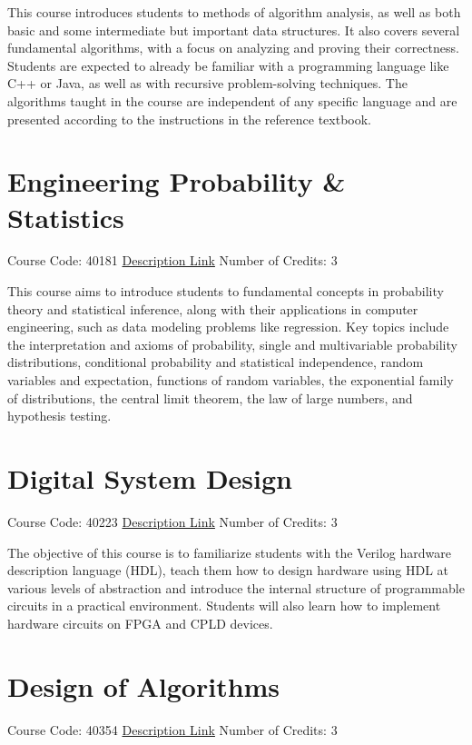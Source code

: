 \documentclass[
fontsize=11pt,
paper=a4,
parskip=half,
enlargefirstpage=off,    %
fromalign=right,        %
fromphone=on,           %
fromemail=on,
fromrule=off,           %
addrfield=off,          %
backaddress=on,         %
subject=beforeopening,  %
locfield=narrow,        %
foldmarks=off,          %
open=any
]{scrartcl}
\begin{document}
This course introduces students to methods of algorithm analysis, as well as both basic and some intermediate but important data structures. It also covers several fundamental algorithms, with a focus on analyzing and proving their correctness. Students are expected to already be familiar with a programming language like C++ or Java, as well as with recursive problem-solving techniques. The algorithms taught in the course are independent of any specific language and are presented according to the instructions in the reference textbook.

\section{Engineering Probability \& Statistics}
Course Code: 40181 \qquad \quad \href{https://docs.ce.sharif.edu/course/40181}{Description Link}
\qquad \quad Number of Credits: 3

This course aims to introduce students to fundamental concepts in probability theory and statistical inference, along with their applications in computer engineering, such as data modeling problems like regression. Key topics include the interpretation and axioms of probability, single and multivariable probability distributions, conditional probability and statistical independence, random variables and expectation, functions of random variables, the exponential family of distributions, the central limit theorem, the law of large numbers, and hypothesis testing.


\section{Digital System Design}
Course Code: 40223 \qquad \quad \href{https://docs.ce.sharif.edu/course/40223}{Description Link}
\qquad \quad Number of Credits: 3

The objective of this course is to familiarize students with the Verilog hardware description language (HDL), teach them how to design hardware using HDL at various levels of abstraction and introduce the internal structure of programmable circuits in a practical environment. Students will also learn how to implement hardware circuits on FPGA and CPLD devices.

\section{Design of Algorithms}
Course Code: 40354 \qquad \quad \href{https://docs.ce.sharif.edu/course/40354}{Description Link}
\qquad \quad Number of Credits: 3
\end{document}
